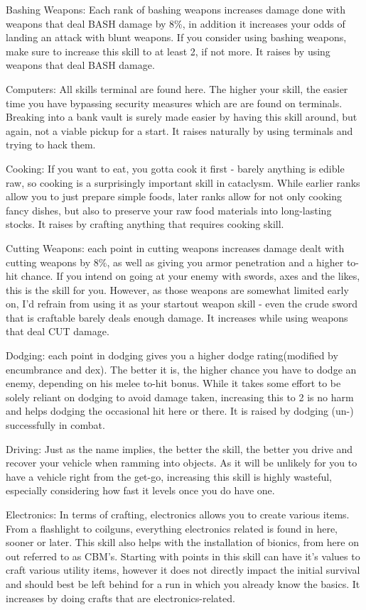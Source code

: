 \documentclass[11pt]{report}
\begin{document}
Bashing Weapons: Each rank of bashing weapons increases damage done with weapons that deal BASH damage by 8\%, in addition it increases your odds of landing an attack with blunt weapons. If you consider using bashing weapons, make sure to increase this skill to at least 2, if not more. It raises by using weapons that deal BASH damage.

Computers: All skills terminal are found here. The higher your skill, the easier time you have bypassing security measures which are are found on terminals. Breaking into a bank vault is surely made easier by having this skill around, but again, not a viable pickup for a start. It raises naturally by using terminals and trying to hack them.

Cooking: If you want to eat, you gotta cook it first - barely anything is edible raw, so cooking is a surprisingly important skill in cataclysm. While earlier ranks allow you to just prepare simple foods, later ranks allow for not only cooking fancy dishes, but also to preserve your raw food materials into long-lasting stocks. It raises by crafting anything that requires cooking skill.

Cutting Weapons: each point in cutting weapons increases damage dealt with cutting weapons by 8\%, as well as giving you armor penetration and a higher to-hit chance. If you intend on going at your enemy with swords, axes and the likes, this is the skill for you. However, as those weapons are somewhat limited early on, I'd refrain from using it as your startout weapon skill - even the crude sword that is craftable barely deals enough damage. It increases while using weapons that deal CUT damage.

Dodging: each point in dodging gives you a higher dodge rating(modified by encumbrance and dex). The better it is, the higher chance you have to dodge an enemy, depending on his melee to-hit bonus. While it takes some effort to be solely reliant on dodging to avoid damage taken, increasing this to 2 is no harm and helps dodging the occasional hit here or there. It is raised by dodging (un-) successfully in combat.

Driving: Just as the name implies, the better the skill, the better you drive and recover your vehicle when ramming into objects. As it will be unlikely for you to have a vehicle right from the get-go, increasing this skill is highly wasteful, especially considering how fast it levels once you do have one.

Electronics: In terms of crafting, electronics allows you to create various items. From a flashlight to coilguns, everything electronics related is found in here, sooner or later. This skill also helps with the installation of bionics, from here on out referred to as CBM's. Starting with points in this skill can have it's values to craft various utility items, however it does not directly impact the initial survival and should best be left behind for a run in which you already know the basics. It increases by doing crafts that are electronics-related.
\end{document}
